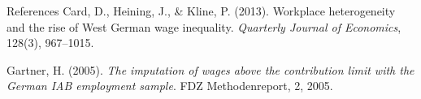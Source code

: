 \documentclass[10pt]{beamer}
\begin{document}

\begin{frame}{References}
\footnotesize
Card, D., Heining, J., \& Kline, P. (2013). Workplace heterogeneity and the rise of West German wage inequality. \emph{Quarterly Journal of Economics}, 128(3), 967--1015.

\vspace{0.15cm}
Gartner, H. (2005). \emph{The imputation of wages above the contribution limit with the German IAB employment sample}. FDZ Methodenreport, 2, 2005.

\end{frame}
\end{document}
